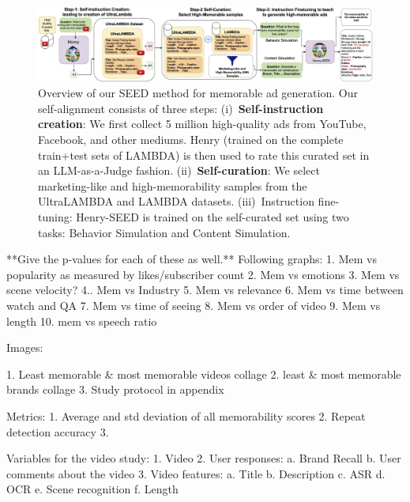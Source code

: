 \begin{landscape}
    \begin{figure}
    \centering
    \includegraphics[width=1.6\textwidth]{images/seed-2.jpg}
    \caption{Overview of our SEED method for memorable ad generation. Our self-alignment consists of three steps: (i)~\textbf{Self-instruction creation}: We first collect 5 million high-quality ads from YouTube, Facebook, and other mediums. Henry (trained on the complete train+test sets of LAMBDA) is then used to rate this curated set in an LLM-as-a-Judge fashion. (ii)~\textbf{Self-curation}: We select marketing-like and high-memorability samples from the UltraLAMBDA and LAMBDA datasets. (iii)~Instruction fine-tuning: Henry-SEED is trained on the self-curated set using two tasks: Behavior Simulation and Content Simulation. 
    \label{fig:Henry-SEED}}    
\end{figure}
\end{landscape}


\iffalse
**Give the p-values for each of these as well.**
Following graphs:
1. Mem vs popularity as measured by likes/subscriber count
2. Mem vs emotions
3. Mem vs scene velocity?
4.. Mem vs Industry
5. Mem vs relevance
6. Mem vs time between watch and QA
7. Mem vs time of seeing
8. Mem vs order of video
9. Mem vs length
10. mem vs speech ratio




Images:

1. Least memorable & most memorable videos collage
2. least & most memorable brands collage
3. Study protocol in appendix



Metrics:
1. Average and std deviation of all memorability scores
2. Repeat detection accuracy
3. 


Variables for the video study:
  1. Video
  2. User responses:
      a. Brand Recall
      b. User comments about the video
  3. Video features:
      a. Title
      b. Description
      c. ASR
      d. OCR
      e. Scene recognition
      f. Length




